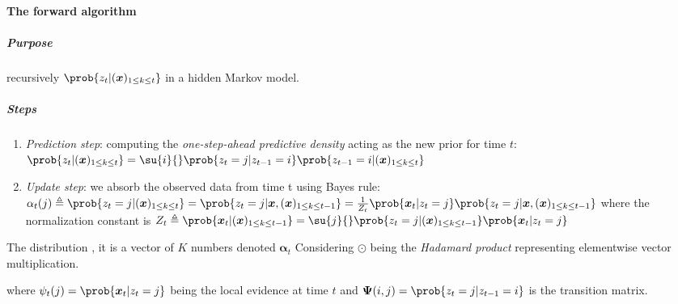 \paragraph{The forward algorithm}
\subparagraph{Purpose} recursively  $\prob{z_{t}|(\bm{x})_{1\leq
k \leq t}}$ in a hidden Markov model.
\subparagraph{Steps}
\begin{enumerate}
    \item \emph{Prediction step}: computing the \emph{one-step-ahead predictive density} acting as 
        the new prior for time $t$: $\prob{z_{t}|(\bm{x})_{1\leq k \leq t}} = \su{i}{}\prob{z_{t}=j|
        z_{t-1}=i}\prob{z_{t-1}=i| (\bm{x})_{1\leq k \leq t}}$
    \item \emph{Update step}: we absorb the observed data from time t using Bayes rule:
        $\alpha_{t}(j) \triangleq \prob{z_{t}=j| (\bm{x})_{1\leq k \leq t}} = \prob{z_{t}=j| \bm{x},
        (\bm{x})_{1\leq k \leq t-1}} = \frac{1}{Z_{t}}\prob{\bm{x}_{t}|z_{t}=j} \prob{z_{t}=j| \bm{x}
    , (\bm{x})_{1\leq k \leq t-1}}$ where  the normalization constant is $Z_{t} \triangleq \prob{
\bm{x}_{t}|(\bm{x})_{1\leq k \leq t-1}} = \su{j}{}\prob{z_{t}=j|(\bm{x})_{1\leq k \leq t-1}}\prob{
\bm{x}_{t}|z_{t}=j}$
\end{enumerate}
The distribution ,
it is a vector of $K$ numbers denoted $\bm{\alpha}_{t}$
Considering $\odot$ being the \emph{Hadamard product} representing elementwise vector multiplication.
\begin{center}
\end{center}
where $\psi_{t}(j) = \prob{\bm{x}_{t}|z_{t}=j}$ being the local evidence at time $t$ and $\bm{\Psi}(
i,j)=\prob{z_{t}=j|z_{t-1}=i}$ is the transition matrix.

